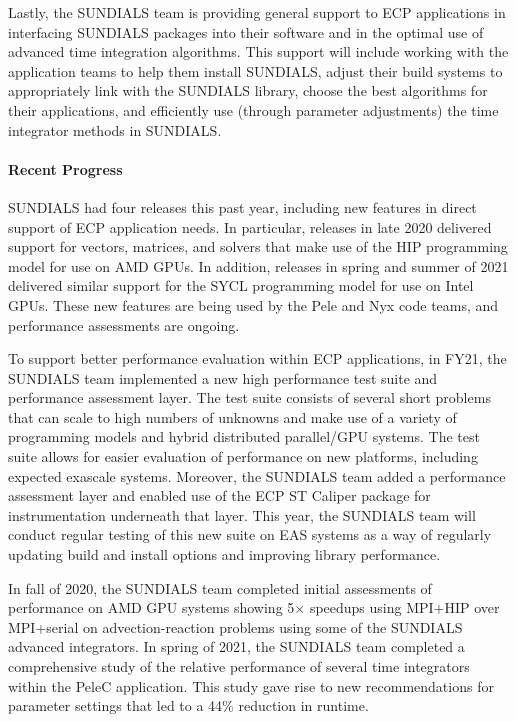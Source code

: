 Lastly, the SUNDIALS team is providing general support to ECP applications in
interfacing SUNDIALS packages into their software and in the optimal use of
advanced time integration algorithms.  This support will include working with
the application teams to help them install SUNDIALS, adjust their build systems
to appropriately link with the SUNDIALS library, choose the best algorithms for
their applications, and efficiently use (through parameter adjustments) the time
integrator methods in SUNDIALS.

\paragraph{Recent Progress}

SUNDIALS had four releases this past year, including new features in direct
support of ECP application needs.  In particular, releases in late 2020
delivered support for vectors, matrices, and solvers that make use of the HIP
programming model for use on AMD GPUs.  In addition, releases in spring and
summer of 2021 delivered similar support for the SYCL programming model for use
on Intel GPUs.  These new features are being used by the Pele and Nyx code
teams, and performance assessments are ongoing.

To support better performance evaluation within ECP applications, in FY21, the
SUNDIALS team implemented a new high performance test suite and performance
assessment layer.  The test suite consists of several short problems that can
scale to high numbers of unknowns and make use of a variety of programming
models and hybrid distributed parallel/GPU systems.  The test suite allows for
easier evaluation of performance on new platforms, including expected exascale
systems.  Moreover, the SUNDIALS team added a performance assessment layer and
enabled use of the ECP ST Caliper package for instrumentation underneath that
layer.  This year, the SUNDIALS team will conduct regular testing of this new
suite on EAS systems as a way of regularly updating build and install options
and improving library performance.

In fall of 2020, the SUNDIALS team completed initial assessments of performance
on AMD GPU systems \cite{balosEnablingGPUAccelerated2021} showing 5$\times$ speedups
using MPI+HIP over MPI+serial on advection-reaction problems using some of the
SUNDIALS advanced integrators.  In spring of 2021, the SUNDIALS team completed a
comprehensive study of the relative performance of several time integrators
within the PeleC application.  This study gave rise to new recommendations for
parameter settings that led to a 44\% reduction in runtime.

